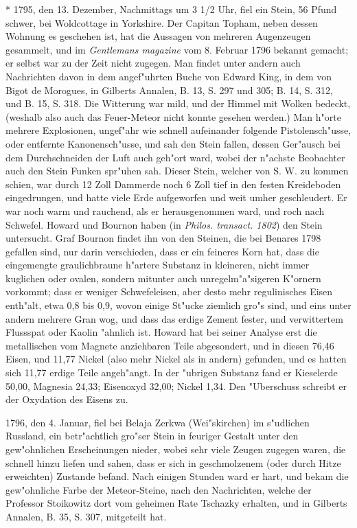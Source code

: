 \documentclass[a4paper, 11pt, oneside, polutonikogreek, german]{article}
\begin{document}
* 1795, den 13. Dezember, Nachmittags um 3 1/2 Uhr, fiel ein Stein, 56 Pfund schwer, bei Woldcottage in Yorkshire. Der Capitan Topham, neben dessen Wohnung es geschehen ist, hat die Aussagen von mehreren Augenzeugen gesammelt, und im \emph{Gentlemans magazine} vom 8. Februar 1796 bekannt gemacht; er selbst war zu der Zeit nicht zugegen. Man findet unter andern auch Nachrichten davon in dem angef"uhrten Buche von Edward King, in dem von Bigot de Morogues, in Gilberts Annalen, B. 13, S. 297 und 305; B. 14, S. 312, und B. 15, S. 318. Die Witterung war mild, und der Himmel mit Wolken bedeckt, (weshalb also auch das Feuer-Meteor nicht konnte gesehen werden.) Man h"orte mehrere Explosionen, ungef"ahr wie schnell aufeinander folgende Pistolensch"usse, oder entfernte Kanonensch"usse, und sah den Stein fallen, dessen Ger"ausch bei dem Durchschneiden der Luft auch geh"ort ward, wobei der n"achste Beobachter auch den Stein Funken spr"uhen sah. Dieser Stein, welcher von S. W. zu kommen schien, war durch 12 Zoll Dammerde noch 6 Zoll tief in den festen Kreideboden eingedrungen, und hatte viele Erde aufgeworfen und weit umher geschleudert. Er war noch warm und rauchend, als er herausgenommen ward, und roch nach Schwefel. Howard und Bournon haben (in \emph{Philos. transact. 1802}) den Stein untersucht. Graf Bournon findet ihn von den Steinen, die bei Benares 1798 gefallen sind, nur darin verschieden, dass er ein feineres Korn hat, dass die eingemengte graulichbraune h"artere Substanz in kleineren, nicht immer kuglichen oder ovalen, sondern mitunter auch unregelm"a"sigeren K"ornern vorkommt; dass er weniger Schwefeleisen, aber desto mehr regulinisches Eisen enth"alt, etwa 0,8 bis 0,9, wovon einige St"ucke ziemlich gro"s sind, und eins unter andern mehrere Gran wog, und dass das erdige Zement fester, und verwittertem Flussspat oder Kaolin "ahnlich ist. Howard hat bei seiner Analyse erst die metallischen vom Magnete anziehbaren Teile abgesondert, und in diesen 76,46 Eisen, und 11,77 Nickel (also mehr Nickel als in andern) gefunden, und es hatten sich 11,77 erdige Teile angeh"angt. In der "ubrigen Substanz fand er Kieselerde 50,00, Magnesia 24,33; Eisenoxyd 32,00; Nickel 1,34. Den "Uberschuss schreibt er der Oxydation des Eisens zu.

1796, den 4. Januar, fiel bei Belaja Zerkwa (Wei"skirchen) im s"udlichen Russland, ein betr"achtlich gro"ser Stein in feuriger Gestalt unter den gew"ohnlichen Erscheinungen nieder, wobei sehr viele Zeugen zugegen waren, die schnell hinzu liefen und sahen, dass er sich in geschmolzenem (oder durch Hitze erweichten) Zustande befand. Nach einigen Stunden ward er hart, und bekam die gew"ohnliche Farbe der Meteor-Steine, nach den Nachrichten, welche der Professor Stoikowitz dort vom geheimen Rate Tschazky erhalten, und in Gilberts Annalen, B. 35, S. 307, mitgeteilt hat.
\end{document}
